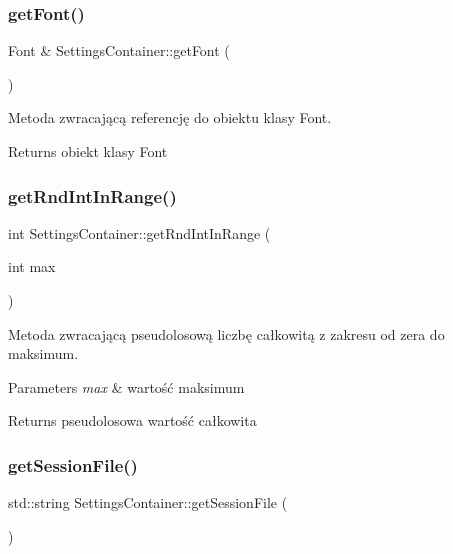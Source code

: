 \subsubsection{\texorpdfstring{getFont()}{getFont()}}
{\footnotesize\ttfamily Font \& Settings\+Container\+::get\+Font (\begin{DoxyParamCaption}{ }\end{DoxyParamCaption})}



Metoda zwracającą referencję do obiektu klasy Font. 

\begin{DoxyReturn}{Returns}
obiekt klasy Font 
\end{DoxyReturn}
\mbox{\label{class_settings_container_ad3e3381e90f32532403ef7bc390ca0a1}} 
\subsubsection{\texorpdfstring{getRndIntInRange()}{getRndIntInRange()}}
{\footnotesize\ttfamily int Settings\+Container\+::get\+Rnd\+Int\+In\+Range (\begin{DoxyParamCaption}\item[{int}]{max }\end{DoxyParamCaption})}



Metoda zwracającą pseudolosową liczbę całkowitą z zakresu od zera do maksimum. 


\begin{DoxyParams}{Parameters}
{\em max} & wartość maksimum \\
\hline
\end{DoxyParams}
\begin{DoxyReturn}{Returns}
pseudolosowa wartość całkowita 
\end{DoxyReturn}
\mbox{\label{class_settings_container_a3749f9771ddd01a1bff093fe84ef5b65}} 
\subsubsection{\texorpdfstring{getSessionFile()}{getSessionFile()}}
{\footnotesize\ttfamily std\+::string Settings\+Container\+::get\+Session\+File (\begin{DoxyParamCaption}{ }\end{DoxyParamCaption})\hspace{0.3cm}{\ttfamily [inline]}}



